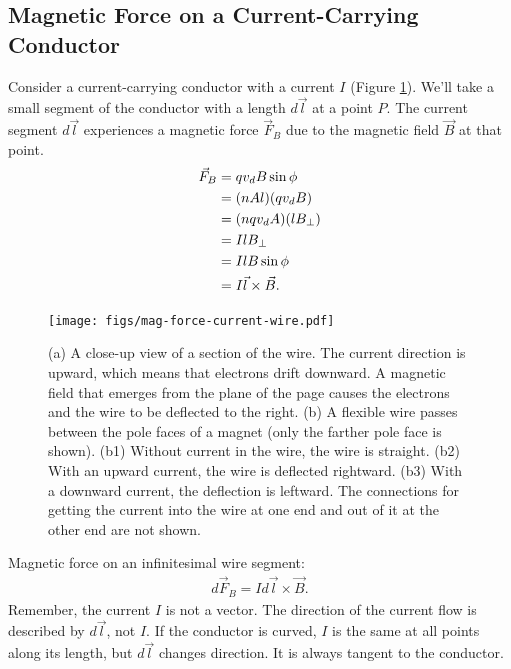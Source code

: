 \documentclass[12pt,b4paper]{article}
\begin{document}
\subsection{Magnetic Force on a Current-Carrying Conductor}
Consider a current-carrying conductor with a current $I$ (Figure \ref{fig:mag-force-def}). We'll take a small segment of the conductor with a length $d\vec{l}$ at a point $P$. The current segment $d\vec{l}$ experiences a magnetic force $\vec{F}_B$ due to the magnetic field $\vec{B}$ at that point.
\begin{align}
    \vec{F}_B&=qv_dB\sin\phi\notag\\
    &=(nAl)(qv_d B)\notag\\
    &=(nqv_dA)(lB_\perp)\notag\\
    &=IlB_\perp\notag\\
    &=IlB\sin\phi\notag\\
    &=I\vec{l}\times\vec{B}.
\end{align}
\begin{figure}[H]
    \centering
    \texttt{[image: figs/mag-force-current-wire.pdf]}
    \caption{(a) A close-up view of a section of the wire. The current direction is upward, which means that electrons drift downward. A magnetic field that emerges from the plane of the page causes the electrons and the wire to be deflected to the right. (b) A flexible wire passes between the pole faces of a magnet (only the farther pole face is shown). (b1) Without current in the wire, the wire is straight. (b2) With an upward current, the wire is deflected rightward. (b3) With a downward current, the deflection is leftward. The connections for getting the current into the wire at one end and out of it at the other end are not shown.}
    \label{fig:mag-force-def}
\end{figure}
Magnetic force on an infinitesimal
wire segment:
\begin{align}
    d\vec{F}_B=Id\vec{l}\times\vec{B}.
\end{align}
Remember, the current $I$ is not a vector. The direction of the current flow is described by $d\vec{l}$, not $I$. If the conductor is curved, $I$ is the same at all points along its length, but $d\vec{l}$ changes direction\textemdash. It is always tangent to the conductor.
\end{document}
